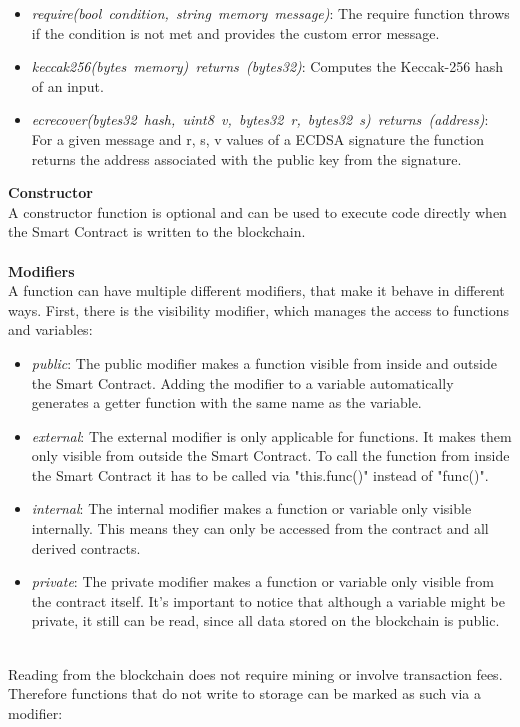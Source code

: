 \begin{itemize}
  \item \textit{require(bool condition, string memory message)}: The require function throws if the condition is not met and provides the custom error message.
  \item \textit{keccak256(bytes memory) returns (bytes32)}: Computes the Keccak-256 hash of an input.
  \item \textit{ecrecover(bytes32 hash, uint8 v, bytes32 r, bytes32 s) returns (address)}: For a given message and r, s, v values of a ECDSA signature the function returns the address associated with the public key from the signature.
\end{itemize}
\leavevmode
\textbf{Constructor}\\
A constructor function is optional and can be used to execute code directly when the Smart Contract is written to the blockchain\cite{doc-constructor}.
\\\\
\textbf{Modifiers}\\
A function can have multiple different modifiers, that make it behave in different ways\cite{doc-modifiers}.
First, there is the visibility modifier, which manages the access to functions and variables:
\begin{itemize}
  \item \textit{public}: The public modifier makes a function visible from inside and outside the Smart Contract. Adding the modifier to a variable automatically generates a getter function with the same name as the variable.
  \item \textit{external}: The external modifier is only applicable for functions. It makes them only visible from outside the Smart Contract. To call the function from inside the Smart Contract it has to be called via "this.func()" instead of "func()".
  \item \textit{internal}: The internal modifier makes a function or variable only visible internally. This means they can only be accessed from the contract and all derived contracts.
  \item \textit{private}: The private modifier makes a function or variable only visible from the contract itself. It's important to notice that although a variable might be private, it still can be read, since all data stored on the blockchain is public.
\end{itemize} 
\leavevmode
\\
Reading from the blockchain does not require mining or involve transaction fees. Therefore functions that do not write to storage can be marked as such via a modifier:
